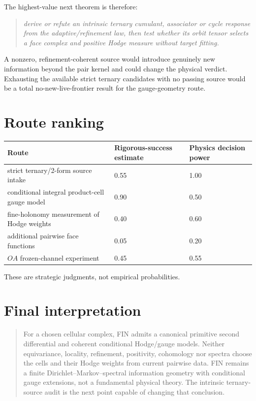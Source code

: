 \documentclass[11pt,a4paper]{article}
\begin{document}
The highest-value next theorem is therefore:
\begin{quote}
\emph{derive or refute an intrinsic ternary cumulant, associator or cycle
response from the adaptive/refinement law, then test whether its orbit tensor
selects a face complex and positive Hodge measure without target fitting.}
\end{quote}

A nonzero, refinement-coherent source would introduce genuinely new information
beyond the pair kernel and could change the physical verdict.  Exhausting the
available strict ternary candidates with no passing source would be a total
no-new-live-frontier result for the gauge-geometry route.

\section{Route ranking}

\begin{longtable}{@{}p{}p{}p{}@{}}
\toprule
Route & Rigorous-success estimate & Physics decision power \\
\midrule\endhead
strict ternary/2-form source intake & 0.55 & 1.00 \\
conditional integral product-cell gauge model & 0.90 & 0.50 \\
fine-holonomy measurement of Hodge weights & 0.40 & 0.60 \\
additional pairwise face functions & 0.05 & 0.20 \\
$OA$ frozen-channel experiment & 0.45 & 0.55 \\
\bottomrule
\end{longtable}

These are strategic judgments, not empirical probabilities.

\section{Final interpretation}

\begin{quote}
For a chosen cellular complex, FIN admits a canonical primitive second
differential and coherent conditional Hodge/gauge models.  Neither equivariance,
locality, refinement, positivity, cohomology nor spectra choose the cells and
their Hodge weights from current pairwise data.  FIN remains a finite
Dirichlet--Markov--spectral information geometry with conditional gauge
extensions, not a fundamental physical theory.  The intrinsic ternary-source
audit is the next point capable of changing that conclusion.
\end{quote}
\end{document}
